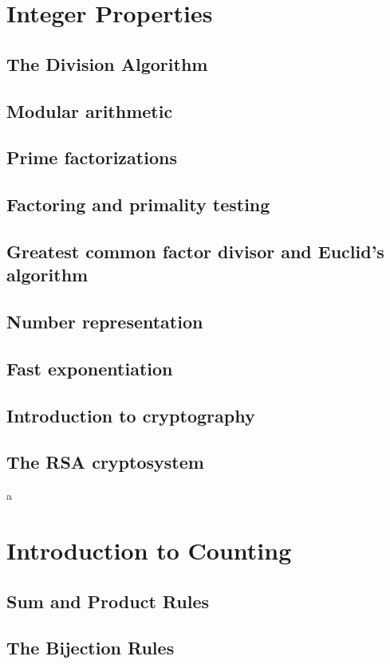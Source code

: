 \documentclass{article}
\begin{document}
\section{Integer Properties}
\subsection{The Division Algorithm}
\subsection{Modular arithmetic}
\subsection{Prime factorizations}
\subsection{Factoring and primality testing}
\subsection{Greatest common factor divisor and Euclid's algorithm}
\subsection{Number representation}
\subsection{Fast exponentiation}
\subsection{Introduction to cryptography}
\subsection{The RSA cryptosystem}

a

\section{Introduction to Counting}
\subsection{Sum and Product Rules}
\subsection{The Bijection Rules}
\end{document}
